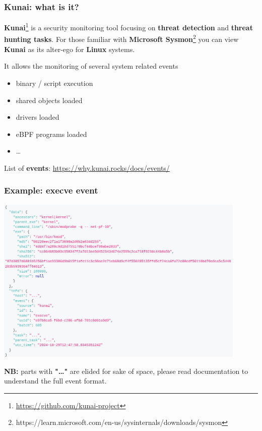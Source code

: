 \begin{frame}
	\frametitle{Kunai: what is it?}

	\textbf{Kunai}\footnote{\url{https://github.com/kunai-project}} is a security monitoring tool focusing on \textbf{threat detection} and \textbf{threat hunting tasks}. For those familiar with \textbf{Microsoft Sysmon}\footnote{https://learn.microsoft.com/en-us/sysinternals/downloads/sysmon} you can view \textbf{Kunai} as its alter-ego for \textbf{Linux} systems.

	\vspace{1em}

	\par
	It allows the monitoring of several system related events
	\begin{itemize}
		\item binary / script execution
		\item shared objects loaded
		\item drivers loaded
		\item eBPF programs loaded
		\item \ldots
	\end{itemize}

	\par
	\vspace{1em}
	List of \textbf{events}: \url{https://why.kunai.rocks/docs/events/}
\end{frame}

\begin{frame}
	\frametitle{Example: execve event}

	\centering
	\includegraphics[width=0.9\textwidth]{img/kunai-execve.png}

	\textbf{NB:} parts with \textbf{"\ldots"} are elided for sake of space, please read documentation to understand the full event format.
\end{frame}

